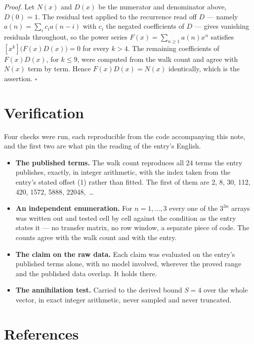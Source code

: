 \documentclass[11pt]{article}
\theoremstyle{definition}
\begin{document}
{\itshape Proof.} Let $N(x)$ and $D(x)$ be the numerator and denominator above, $D(0)=1$. The residual test applied to the recurrence read off $D$ --- namely $a(n) = \sum_i c_i a(n-i)$ with $c_i$ the negated coefficients of $D$ --- gives vanishing residuals throughout, so the power series $F(x)=\sum_{n\ge 1}a(n)x^n$ satisfies $[x^k]\bigl(F(x)D(x)\bigr) = 0$ for every $k > 4$. The remaining coefficients of $F(x)D(x)$, for $k \le 9$, were computed from the walk count and agree with $N(x)$ term by term. Hence $F(x)D(x) = N(x)$ identically, which is the assertion. $\square$

\section{Verification}

Four checks were run, each reproducible from the code accompanying this note, and the first two are what pin the reading of the entry's English.

\begin{itemize}

\item {\bfseries The published terms.} The walk count reproduces all 24 terms the entry publishes, exactly, in integer arithmetic, with the index taken from the entry's stated offset (1) rather than fitted. The first of them are 2, 8, 30, 112, 420, 1572, 5888, 22048,~\dots

\item {\bfseries An independent enumeration.} For $n = 1,\dots,3$ every one of the $3^{3n}$ arrays was written out and tested cell by cell against the condition as the entry states it --- no transfer matrix, no row window, a separate piece of code. The counts agree with the walk count and with the entry.

\item {\bfseries The claim on the raw data.} Each claim was evaluated on the entry's published terms alone, with no model involved, wherever the proved range and the published data overlap. It holds there.

\item {\bfseries The annihilation test.} Carried to the derived bound $S = 4$ over the whole vector, in exact integer arithmetic, never sampled and never truncated.

\end{itemize}

\section{References}
\end{document}
